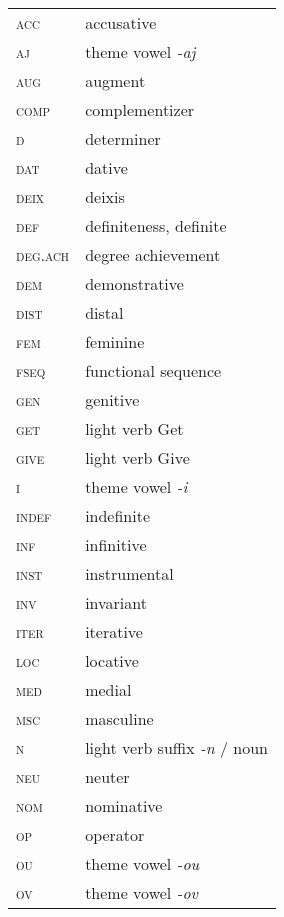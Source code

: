 
\begin{multicols}{2} 


\begin{tabular}{lp{4.5cm}} 
\textsc{acc}		&	accusative \\
\textsc{aj}			&	theme vowel \textit{-aj}\\
\textsc{aug}		&	augment\\
\textsc{comp}		&	complementizer\\
\textsc{d}			&	determiner\\
\textsc{dat}		&	dative\\
\textsc{deix}		&	deixis\\
\textsc{def}		&	definiteness, definite\\
\textsc{deg.ach}	&	degree achievement\\
\textsc{dem}		&	demonstrative \\
\textsc{dist}		&	distal\\
\textsc{fem}		&	feminine\\
\textsc{fseq}		&	functional sequence\\
\textsc{gen}		&	genitive \\
\textsc{get}		&	light verb Get\\
\textsc{give}		&	light verb Give\\
\textsc{i}			&	theme vowel \textit{-i}\\
\textsc{indef}		&	indefinite\\
\textsc{inf}		&	infinitive\\
\textsc{inst}		&	instrumental\\
\textsc{inv}		&	invariant\\
\textsc{iter}		&	iterative\\
\textsc{loc}		&	locative\\
\textsc{med}		&	medial\\
\textsc{msc}		&	masculine\\
\textsc{n}			&	light verb suffix \textit{-n} / noun\\
\textsc{neu}		&	neuter\\
\textsc{nom} 		&	nominative \\
\textsc{op}		&	operator\\
\textsc{ou}		&	theme vowel \textit{-ou}\\
\textsc{ov}		&	theme vowel \textit{-ov}\\
\end{tabular}
%
\begin{tabular}{lp{4.5cm}} 

\end{tabular}
\end{multicols}
